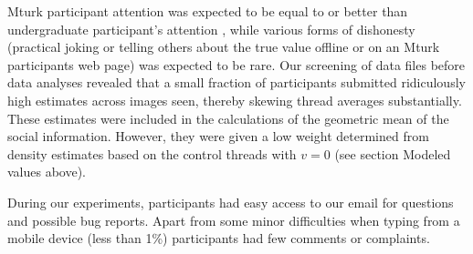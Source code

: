\documentclass[9pt,a4paper,twocolumn,lineno]{article}
\begin{document}
Mturk participant attention was expected to be equal to or better than undergraduate participant’s attention \cite{hauser2016attentive}, while various forms of dishonesty (practical joking or telling others about the true value offline or on an Mturk participants web page) was expected to be rare. Our screening of data files before data analyses revealed that a small fraction of participants submitted ridiculously high estimates across images seen, thereby skewing thread averages substantially. These estimates were included in the calculations of the geometric mean of the social information. However, they were given a low weight determined from density estimates based on the control threads with $v=0$ (see section Modeled values above).

During our experiments, participants had easy access to our email for questions and possible bug reports. Apart from some minor difficulties when typing from a mobile device (less than 1\%) participants had few comments or complaints.

\end{document}

